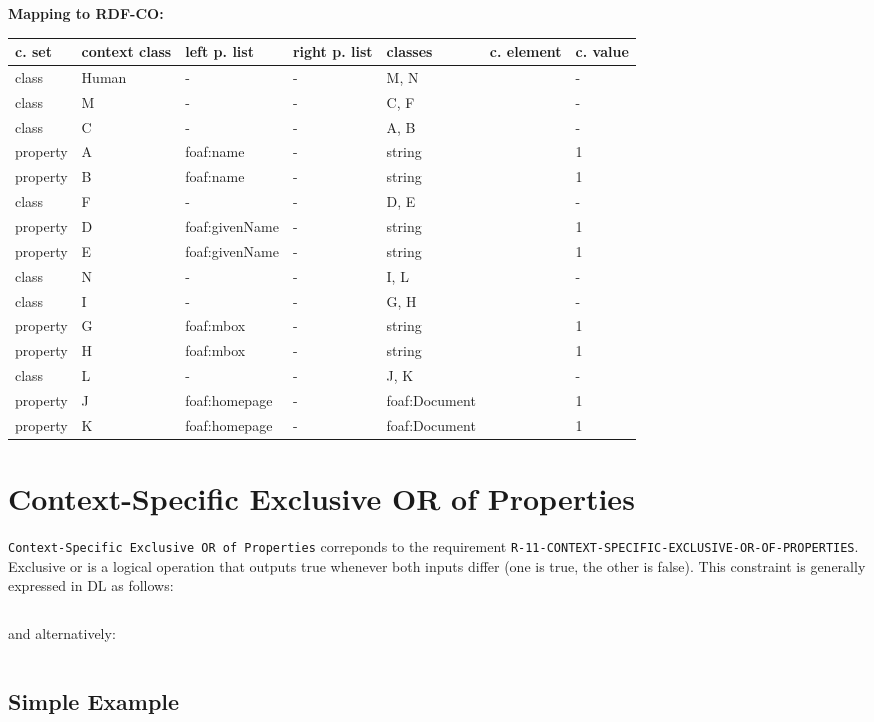 \documentclass{llncs}
\newcommand{\ms}[1]{\texttt{#1}}
\newenvironment{gcotable}{
  \scriptsize
  \sffamily
  \vspace{0cm}
	\begin{center}
	\textbf{\vspace{0.4cm}Mapping to RDF-CO:} \\
  \begin{tabular}{l|l|l|l|l|l|l}
	\hline
  \textbf{c. set} & \textbf{context class} & \textbf{left p. list} & \textbf{right p. list} & \textbf{classes} & \textbf{c. element} & \textbf{c. value} \\
  \hline

}{
  \hline
  \end{tabular}
	\end{center}
}
\newenvironment{DL}{
\vspace{0cm}
	\begin{center}
  \begin{tabular}{r l}

}{
  \end{tabular}
	\end{center}
}
\begin{document}
\begin{gcotable}
class & Human & - & - & M, N &  & - \\
\hline
class & M & - & - & C, F &  & - \\
class & C & - & - & A, B &  & - \\
property & A & foaf:name & - & string &  & 1 \\
property & B & foaf:name & - & string &  & 1 \\
class & F & - & - & D, E &  & - \\
property & D & foaf:givenName & - & string &  & 1 \\
property & E & foaf:givenName & - & string &  & 1 \\
\hline
class & N & - & - & I, L &  & - \\
class & I & - & - & G, H &  & - \\
property & G & foaf:mbox & - & string &  & 1 \\
property & H & foaf:mbox & - & string &  & 1 \\
class & L & - & - & J, K &  & - \\
property & J & foaf:homepage & - & foaf:Document &  & 1 \\
property & K & foaf:homepage & - & foaf:Document &  & 1 \\
\end{gcotable}

\section{Context-Specific Exclusive OR of Properties}

\ms{Context-Specific Exclusive OR of Properties} correponds to the requirement
\ms{R-11-CONTEXT-SPECIFIC-EXCLUSIVE-OR-OF-PROPERTIES}.
Exclusive or is a logical operation that outputs true whenever both inputs differ (one is true, the other is false).
This constraint is generally expressed in DL as follows:

\begin{DL}
 \\
\end{DL}

and alternatively:

\begin{DL}
 \\
\end{DL}

\subsection{Simple Example}
\end{document}
